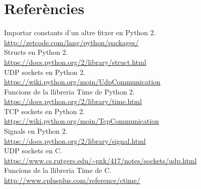 \documentclass[11pt]{article}
\begin{document}
\section{Referències}
Importar constants d'un altre fitxer en Python 2.\\
\url{http://zetcode.com/lang/python/packages/}\\
Structs en Python 2.\\
\url{https://docs.python.org/2/library/struct.html}\\
UDP sockets en Python 2.\\
\url{https://wiki.python.org/moin/UdpCommunication}\\
Funcions de la llibreria Time de Python 2.\\	
\url{https://docs.python.org/2/library/time.html}\\
TCP sockets en Python 2.\\
\url{https://wiki.python.org/moin/TcpCommunication}\\
Signals en Python 2.\\
\url{https://docs.python.org/2/library/signal.html}\\
UDP sockets en C.\\
\url{https://www.cs.rutgers.edu/~pxk/417/notes/sockets/udp.html}\\
Funcions de la llibreria Time de C.\\
\url{http://www.cplusplus.com/reference/ctime/}
\end{document}
